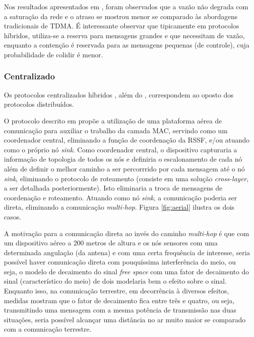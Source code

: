 \documentclass[12pt]{article}
\begin{document}
    Nos resultados apresentados em \cite{20083811560517}, foram observados que a vazão não degrada com a saturação da rede e o atraso se mostrou menor se comparado às abordagens tradicionais de TDMA. É interessante observar que tipicamente em protocolos híbridos, utiliza-se a reserva para mensagens grandes e que necessitam de vazão, enquanto a contenção é reservada para as mensagens pequenas (de controle), cuja probabilidade de colidir é menor.


  \subsubsection{Centralizado}
    Os protocolos centralizados híbridos \cite{20102613044996, 20092812183087}, além do \cite{20100312645920}, correspondem ao oposto dos protocolos distribuídos.

    O protocolo descrito em \cite{20100312645920} propõe a utilização de uma plataforma aérea de comunicação para auxiliar o trabalho da camada MAC, servindo como um coordenador central, eliminando a função de coordenação da RSSF, e/ou atuando como o próprio nó \textit{sink}. Como coordenador central, o dispositivo capturaria a informação de topologia de todos os nós e definiria o escalonamento de cada nó além de definir o melhor caminho a ser percorrrido por cada mensagem até o nó \textit{sink}, eliminando o protocolo de roteamento (consiste em uma solução \textit{cross-layer}, a ser detalhada posteriormente). Isto eliminaria a troca de mensagens de coordenação e roteamento. Atuando como nó \textit{sink}, a comunicação poderia ser direta, eliminando a comunicação \textit{multi-hop}. Figura \ref{fig:aerial} ilustra os dois casos.

    A motivação para a comunicação direta ao invés do caminho \textit{multi-hop} é que com um dispositivo aéreo a 200 metros de altura e os nós sensores com uma determinada angulação (da antena) e com uma certa frequência de interesse, seria possível haver comunicação direta com pouquíssima interferência do meio, ou seja, o modelo de decaimento do sinal \textit{free space} com uma fator de decaimento do sinal (característico do meio) de dois modelaria bem o efeito sobre o sinal. Enquanto isso, na comunicação terrestre, em decorrência à diversos efeitos, medidas mostram que o fator de decaimento fica entre três e quatro, ou seja, transmitindo uma mensagem com a mesma potência de transmissão nas duas situações, seria possível alcançar uma distância no ar muito maior se comparado com a comunicação terrestre.
\end{document}
